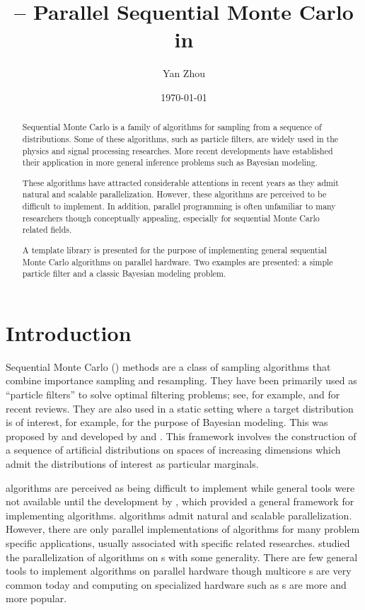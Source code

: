\documentclass[11pt,bib,hyper]{marticle}
\begin{document}
\title{\protect\vsmc{} -- Parallel Sequential Monte Carlo in \protect\cpp}
\author{Yan Zhou}
\date{\today}

\maketitle

\begin{abstract}
  Sequential Monte Carlo is a family of algorithms for sampling from a sequence
  of distributions. Some of these algorithms, such as particle filters, are
  widely used in the physics and signal processing researches.  More recent
  developments have established their application in more general inference
  problems such as Bayesian modeling.

  These algorithms have attracted considerable attentions in recent years as
  they admit natural and scalable parallelization. However, these algorithms
  are perceived to be difficult to implement. In addition, parallel programming
  is often unfamiliar to many researchers though conceptually appealing,
  especially for sequential Monte Carlo related fields.

  A \cpp template library is presented for the purpose of implementing general
  sequential Monte Carlo algorithms on parallel hardware. Two examples are
  presented: a simple particle filter and a classic Bayesian modeling problem.
\end{abstract}

\section{Introduction}
\label{sec:Introduction}

Sequential Monte Carlo (\smc) methods are a class of sampling algorithms that
combine importance sampling and resampling. They have been primarily used as
``particle filters'' to solve optimal filtering problems; see, for example,
\textcite{Cappe:2007hz} and \textcite{Doucet:2011us} for recent reviews. They are
also used in a static setting where a target distribution is of interest, for
example, for the purpose of Bayesian modeling. This was proposed by
\textcite{DelMoral:2006hc} and developed by \textcite{Peters:2005wh} and
\textcite{DelMoral:2006wv}. This framework involves the construction of a sequence
of artificial distributions on spaces of increasing dimensions which admit the
distributions of interest as particular marginals.

\smc algorithms are perceived as being difficult to implement while general
tools were not available until the development by \textcite{Johansen:2009wd}, which
provided a general framework for implementing \smc algorithms. \smc algorithms
admit natural and scalable parallelization. However, there are only parallel
implementations of \smc algorithms for many problem specific applications,
usually associated with specific \smc related researches. \textcite{Lee:2010fm}
studied the parallelization of \smc algorithms on \gpu{}s with some
generality. There are few general tools to implement \smc algorithms on
parallel hardware though multicore \cpu{}s are very common today and computing
on specialized hardware such as \gpu{}s are more and more popular.
\end{document}
